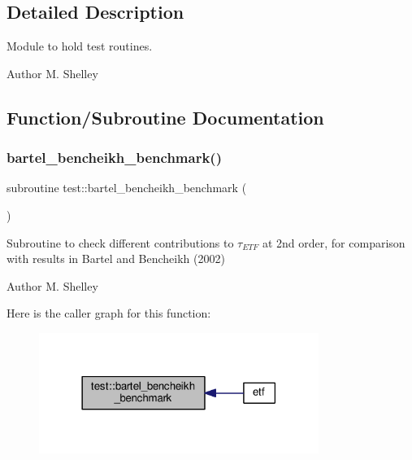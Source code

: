 \subsection{Detailed Description}
Module to hold test routines. 

\begin{DoxyAuthor}{Author}
M. Shelley 
\end{DoxyAuthor}


\subsection{Function/\+Subroutine Documentation}
\mbox{\label{namespacetest_a8eb520f312c2647e714f169e9d5b8421}} 
\subsubsection{\texorpdfstring{bartel\+\_\+bencheikh\+\_\+benchmark()}{bartel\_bencheikh\_benchmark()}}
{\footnotesize\ttfamily subroutine test\+::bartel\+\_\+bencheikh\+\_\+benchmark (\begin{DoxyParamCaption}{ }\end{DoxyParamCaption})}



Subroutine to check different contributions to $\tau_{ETF}$ at 2nd order, for comparison with results in Bartel and Bencheikh (2002) 

\begin{DoxyAuthor}{Author}
M. Shelley 
\end{DoxyAuthor}
Here is the caller graph for this function\+:
\nopagebreak
\begin{figure}[H]
\begin{center}
\leavevmode
\includegraphics[width=258pt]{namespacetest_a8eb520f312c2647e714f169e9d5b8421_icgraph}
\end{center}
\end{figure}
\mbox{\label{namespacetest_a12069a39539c68f8d22f7eb4219d2e2b}} 
